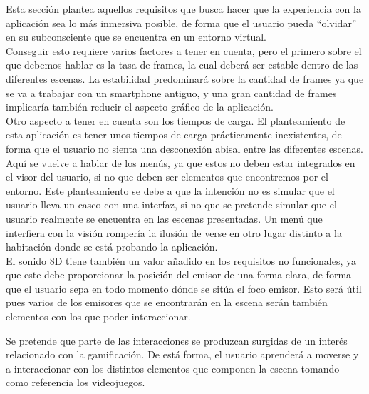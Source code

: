 
\quad Esta sección plantea aquellos requisitos que busca hacer que la experiencia con la aplicación sea lo más inmersiva posible, de forma que el usuario pueda “olvidar” en su subconsciente que se encuentra en un entorno virtual.\\

\quad Conseguir esto requiere varios factores a tener en cuenta, pero el primero sobre el que debemos hablar es la tasa de frames, la cual deberá ser estable dentro de las diferentes escenas. La estabilidad predominará sobre la cantidad de frames ya que se va a trabajar con un smartphone antiguo, y una gran cantidad de frames implicaría también reducir el aspecto gráfico de la aplicación.\\

\quad Otro aspecto a tener en cuenta son los tiempos de carga. El planteamiento de esta aplicación es tener unos tiempos de carga prácticamente inexistentes, de forma que el usuario no sienta una desconexión abisal entre las diferentes escenas.\\

\quad Aquí se vuelve a hablar de los menús, ya que estos no deben estar integrados en el visor del usuario, si no que deben ser elementos que encontremos por el entorno. Este planteamiento se debe a que la intención no es simular que el usuario lleva un casco con una interfaz, si no que se pretende simular que el usuario realmente se encuentra en las escenas presentadas. Un menú que interfiera con la visión rompería la ilusión de verse en otro lugar distinto a la habitación donde se está probando la aplicación.\\

\quad El sonido 8D tiene también un valor añadido en los requisitos no funcionales, ya que este debe proporcionar la posición del emisor de una forma clara, de forma que el usuario sepa en todo momento dónde se sitúa el foco emisor. Esto será útil pues varios de los emisores que se encontrarán en la escena serán también elementos con los que poder interaccionar.\\


\quad Se pretende que parte de las interacciones se produzcan surgidas de un interés relacionado con la gamificación. De está forma, el usuario aprenderá a moverse y a interaccionar con los distintos elementos que componen la escena tomando como referencia los videojuegos.\\



\newpage


